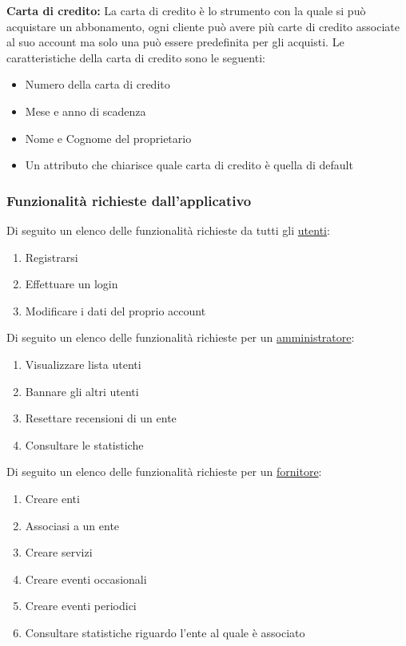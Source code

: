 \textbf{Carta di credito:} La carta di credito è lo strumento con la quale si può acquistare un abbonamento, ogni cliente può avere più carte di credito associate al suo account ma solo una può essere predefinita per gli acquisti.
Le caratteristiche della carta di credito sono le seguenti:
\begin{itemize}
    \item Numero della carta di credito
    \item Mese e anno di scadenza
    \item Nome e Cognome del proprietario
    \item Un attributo che chiarisce quale carta di credito è quella di default
\end{itemize}




\vspace{0.5cm}
\subsubsection{Funzionalità richieste dall'applicativo}


Di seguito un elenco delle funzionalità richieste da tutti gli \ul{utenti}:
\begin{enumerate}[label=u\arabic*)]
    \item Registrarsi
    \item Effettuare un login
    \item Modificare i dati del proprio account
\end{enumerate}

\vspace{0.5cm}


Di seguito un elenco delle funzionalità richieste per un \ul{amministratore}:
\begin{enumerate}[label=a\arabic*)]
    \item Visualizzare lista utenti
    \item Bannare gli altri utenti
    \item Resettare recensioni di un ente
    \item Consultare le statistiche
\end{enumerate}

\vspace{0.5cm}

Di seguito un elenco delle funzionalità richieste per un \ul{fornitore}: 
\begin{enumerate}[label=b\arabic*)]
    \item Creare enti
    \item Associasi a un ente
    \item Creare servizi
    \item Creare eventi occasionali
    \item Creare eventi periodici
    \item Consultare statistiche riguardo l'ente al quale è associato 
\end{enumerate}

